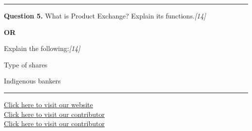 \documentclass[11pt,a4paper]{article}
\newcommand{\pts}[1]{\hfill   \textit{[#1]}}
\begin{document}
\medskip\rule{\linewidth}{0.2pt}




\noindent   \textbf{Question 5.}
What is Product Exchange? Explain its functions.\pts{14}

\centerline{   \textbf{OR}}

Explain the following:\pts{14}

\begin{parts}
  \item Type of shares
  \item Indigenous bankers
\end{parts}

\vfill
\rule{\linewidth}{0.4pt}

\begin{center}\small
\href{https://bhu-exam.vercel.app/}{Click here to visit our website}\\[4pt]
\href{https://me-aryan.vercel.app/}{Click here to visit our contributor}\\[4pt]
\href{https://quashan-me.vercel.app/}{Click here to visit our contributor}
\end{center}
\end{document}
